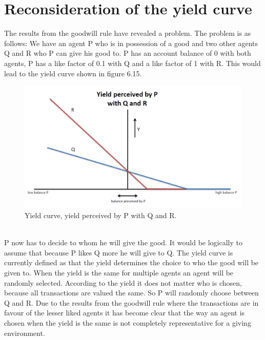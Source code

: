 \documentclass[twoside,openright]{uva-bachelor-thesis}
\begin{document}
\section{Reconsideration of the yield curve}
The results from the goodwill rule have revealed a problem. The problem is as follows: We have an agent P who is in possession of a good and two other agents Q and R who P can give his good to. P has an account balance of 0 with both agents, P has a like factor of 0.1 with Q and a like factor of 1 with R. This would lead to the yield curve shown in figure 6.15. \\
\begin{figure}[h!]
\centering
\includegraphics[scale=0.4]{YieldCurves/yieldcurve_P_QR}
\caption{Yield curve, yield perceived by P with Q and R.}
\end{figure}
\\
P now has to decide to whom he will give the good. It would be logically to assume that because P likes Q more he will give to Q. The yield curve is currently defined as that the yield determines the choice to who the good will be given to. When the yield is the same for multiple agents an agent will be randomly selected. According to the yield it does not matter who is chosen, because all transactions are valued the same. So P will randomly choose between Q and R. Due to the results from the goodwill rule where the transactions are in favour of the lesser liked agents it has become clear that the way an agent is chosen when the yield is the same is not completely representative for a giving environment.
\end{document}
